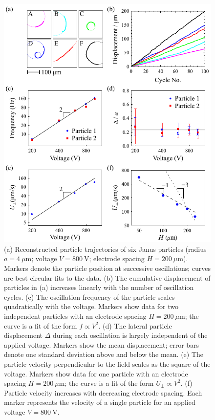 \begin{figure}[p]
\centering
\includegraphics[width=11.2cm]{figures/2_2.pdf}
\caption{(a) Reconstructed particle trajectories of six Janus particles (radius $a = 4~\mu\text{m}$; voltage $V=800~\text{V}$; electrode spacing $H=200~\mu\text{m}$).  Markers denote the particle position at successive oscillations; curves are best circular fits to the data. (b) The cumulative displacement of particles in (a) increases linearly with the number of oscillation cycles. (c) The oscillation frequency of the particle scales quadratically with the voltage.  Markers show data for two independent particles with an electrode spacing $H=200~\mu\text{m}$; the curve is a fit of the form $f\propto V^2$. (d) The lateral particle  displacement $\Delta$ during each oscillation is largely independent of the applied voltage. Markers show the mean displacement; error bars denote one standard deviation above and below the mean. (e) The particle velocity perpendicular to the field scales as the square of the voltage. Markers show data for one particle with an electrode spacing $H=200~\mu\text{m}$; the curve is a fit of the form $U_{\perp}\propto V^2$. (f) Particle velocity increases with decreasing electrode spacing. Each marker represents the velocity of a single particle for an applied voltage $V=800~\text{V}$.}
\label{fig:2.2}
\end{figure}

